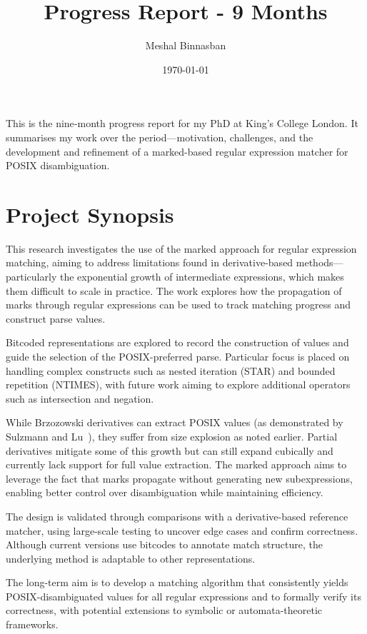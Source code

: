 \documentclass[11pt]{article}
\title{Progress Report - 9 Months}
\author{Meshal Binnasban}
\date{\today}
\begin{document}
\maketitle

This is the nine‑month progress report for my PhD at King's College London. It summarises my work over the period—motivation, challenges, and the development and refinement of a marked-based regular expression matcher for POSIX disambiguation.
\newpage
\section*{Project Synopsis}
This research investigates the use of the marked approach for regular expression matching, aiming to address limitations found in derivative-based methods—particularly the exponential growth of intermediate expressions, which makes them difficult to scale in practice. The work explores how the propagation of marks through regular expressions can be used to track matching progress and construct parse values.

Bitcoded representations are explored to record the construction of values and guide the selection of the POSIX-preferred parse. Particular focus is placed on handling complex constructs such as nested iteration (STAR) and bounded repetition (NTIMES), with future work aiming to explore additional operators such as intersection and negation.

While Brzozowski derivatives can extract POSIX values (as demonstrated by Sulzmann and Lu~\cite{Sulzmann2014}), they suffer from size explosion as noted earlier. Partial derivatives mitigate some of this growth but can still expand cubically and currently lack support for full value extraction. The marked approach aims to leverage the fact that marks propagate without generating new subexpressions, enabling better control over disambiguation while maintaining efficiency.

The design is validated through comparisons with a derivative-based reference matcher, using large-scale testing to uncover edge cases and confirm correctness. Although current versions use bitcodes to annotate match structure, the underlying method is adaptable to other representations.

The long-term aim is to develop a matching algorithm that consistently yields POSIX-disambiguated values for all regular expressions and to formally verify its correctness, with potential extensions to symbolic or automata-theoretic frameworks.
\end{document}

